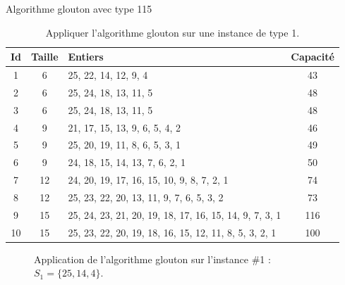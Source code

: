 \begin{exercice}[label=ex:GS1]{Algorithme glouton avec type 1}{15}

\begin{table}[H]
\centering
\begin{tabular}{cclc}
  \toprule
Id & Taille & Entiers & Capacité \\
  \midrule
  1 &   6 & 25, 22, 14, 12, 9, 4 &  43 \\
    2 &   6 & 25, 24, 18, 13, 11, 5 &  48 \\
    3 &   6 & 25, 24, 18, 13, 11, 5 &  48 \\
    4 &   9 & 21, 17, 15, 13, 9, 6, 5, 4, 2 &  46 \\
    5 &   9 & 25, 20, 19, 11, 8, 6, 5, 3, 1 &  49 \\
    6 &   9 & 24, 18, 15, 14, 13, 7, 6, 2, 1 &  50 \\
    7 &  12 & 24, 20, 19, 17, 16, 15, 10, 9, 8, 7, 2, 1 &  74 \\
    8 &  12 & 25, 23, 22, 20, 13, 11, 9, 7, 6, 5, 3, 2 &  73 \\
    9 &  15 & 25, 24, 23, 21, 20, 19, 18, 17, 16, 15, 14, 9, 7, 3, 1 & 116 \\
   10 &  15 & 25, 23, 22, 20, 19, 18, 16, 15, 12, 11, 8, 5, 3, 2, 1 & 100 \\
   \bottomrule
\end{tabular}
\caption{Appliquer l'algorithme glouton sur une instance de type 1.}
\label{tab:GS1}
\end{table}

\end{exercice}

\begin{figure}[htbp]
\centering
{}
\caption{Application de l'algorithme glouton sur l'instance \#1 : $S_1 = \{25,14,4\}$.}
\label{fig:GS1-1}
\end{figure}

